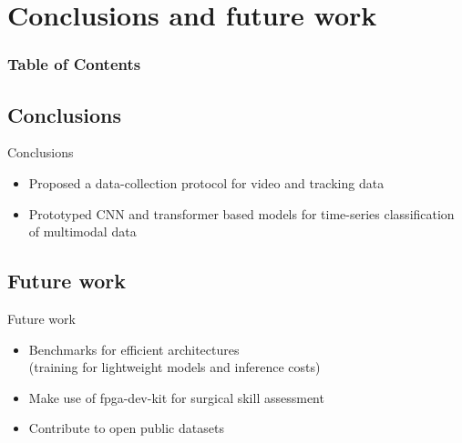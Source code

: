 
\section{Conclusions and future work}

\begin{frame}
  \frametitle{Table of Contents}
  \tableofcontents[currentsection]
\end{frame}

\subsection{Conclusions}
{
\begin{frame}{Conclusions}

\begin{itemize}
\item Proposed a data-collection protocol for video and tracking data
\item Prototyped CNN and transformer based models for time-series classification of multimodal data
\end{itemize}

\end{frame}
}


\subsection{Future work}
{
\begin{frame}{Future work}

\begin{itemize}
\item Benchmarks for efficient architectures \\ (training for lightweight models and inference costs)
\item Make use of fpga-dev-kit for surgical skill assessment
\item Contribute to open public datasets
\end{itemize}

\end{frame}
}


